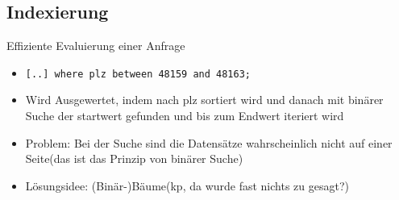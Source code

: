 \documentclass{article}
\begin{document}
\subsection*{Indexierung}

\begin{block}{Effiziente Evaluierung einer Anfrage}
  \begin{itemize}
    \item \texttt{[..] where plz between 48159 and 48163;}
    \item Wird Ausgewertet, indem nach plz sortiert wird und danach mit binärer Suche der startwert gefunden und bis zum Endwert iteriert wird
    \item Problem: Bei der Suche sind die Datensätze wahrscheinlich nicht auf einer Seite(das ist das Prinzip von binärer Suche)
    \item Lösungsidee: (Binär-)Bäume(kp, da wurde fast nichts zu gesagt?)
  \end{itemize}
\end{block}
\end{document}
